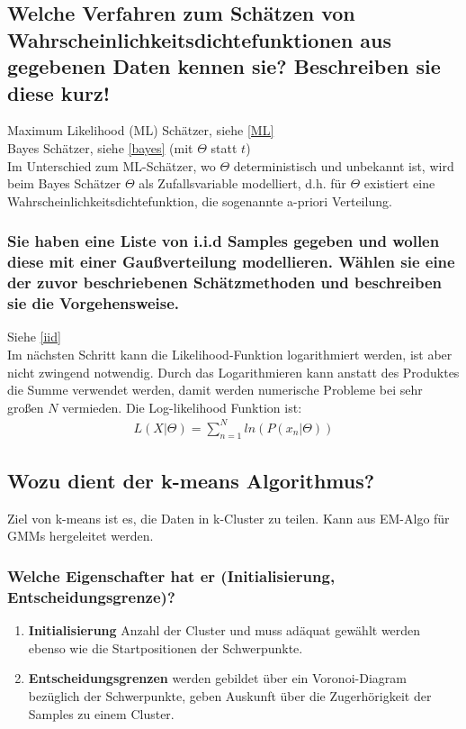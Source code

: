 \documentclass[12pt]{scrartcl}
\begin{document}
\subsection{Welche Verfahren zum Schätzen von Wahrscheinlichkeitsdichtefunktionen aus gegebenen Daten kennen sie? Beschreiben sie diese kurz!}

Maximum Likelihood (ML) Schätzer, siehe \ref{ML} \\
Bayes Schätzer, siehe \ref{bayes} (mit $\Theta$ statt $t$) \\
Im Unterschied zum ML-Schätzer, wo $\Theta$ deterministisch und unbekannt ist, wird beim Bayes Schätzer $\Theta$ als Zufallsvariable modelliert, d.h. für $\Theta$ existiert eine Wahrscheinlichkeitsdichtefunktion, die sogenannte a-priori Verteilung.

\subsubsection{Sie haben eine Liste von i.i.d Samples gegeben und wollen diese mit einer Gaußverteilung modellieren. Wählen sie eine der zuvor beschriebenen Schätzmethoden und beschreiben sie die Vorgehensweise.}

Siehe \ref{iid} \\
Im nächsten Schritt kann die Likelihood-Funktion logarithmiert werden, ist aber nicht zwingend notwendig. Durch das Logarithmieren kann anstatt des Produktes die Summe verwendet werden, damit werden numerische Probleme bei sehr großen $N$ vermieden. Die Log-likelihood Funktion ist:
\begin{align*}
L(X|\Theta) = \sum_{n=1}^N ln( P(x_n|\Theta))
\end{align*}

\subsection{Wozu dient der k-means Algorithmus?}

Ziel von k-means ist es, die Daten in k-Cluster zu teilen. Kann aus EM-Algo für GMMs hergeleitet werden.

\subsubsection{Welche Eigenschafter hat er (Initialisierung, Entscheidungsgrenze)?}
\begin{enumerate}
\item {\bf Initialisierung} Anzahl der Cluster und muss adäquat gewählt werden ebenso wie die Startpositionen der Schwerpunkte.
\item {\bf Entscheidungsgrenzen} werden gebildet über ein Voronoi-Diagram bezüglich der Schwerpunkte, geben Auskunft über die Zugerhörigkeit der Samples zu einem Cluster.
\end{enumerate}
\end{document}
